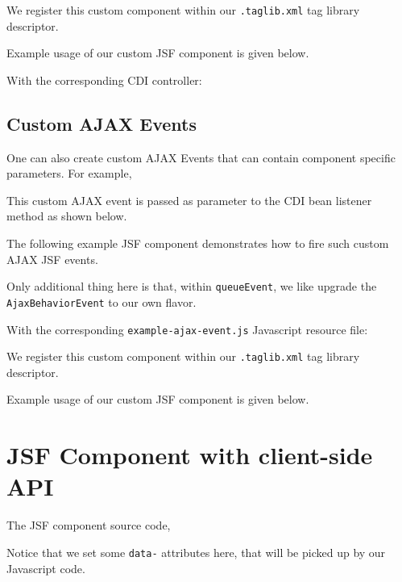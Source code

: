 We register this custom component within our \texttt{.taglib.xml} tag library descriptor.


Example usage of our custom JSF component is given below.


With the corresponding CDI controller:


\subsection{Custom AJAX Events}

One can also create custom AJAX Events that can contain component specific parameters.
For example,


This custom AJAX event is passed as parameter to the CDI bean listener method as shown below.


The following example JSF component demonstrates how to fire such custom AJAX JSF events.

Only additional thing here is that, within \texttt{queueEvent}, we like upgrade the \texttt{AjaxBehaviorEvent} to our own flavor.

With the corresponding \texttt{example-ajax-event.js} Javascript resource file:


We register this custom component within our \texttt{.taglib.xml} tag library descriptor.


Example usage of our custom JSF component is given below.


\section{JSF Component with client-side API}
The JSF component source code,

Notice that we set some \texttt{data-} attributes here, that will be picked up by our Javascript code.

